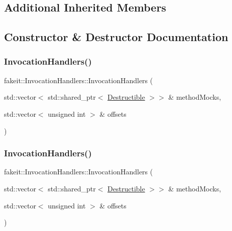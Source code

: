 \subsection*{Additional Inherited Members}


\subsection{Constructor \& Destructor Documentation}
\mbox{\label{classfakeit_1_1InvocationHandlers_a2fd61aecd4f313aa0ca83b2ab438eeef}} 
\subsubsection{\texorpdfstring{InvocationHandlers()}{InvocationHandlers()}\hspace{0.1cm}{\footnotesize\ttfamily [1/9]}}
{\footnotesize\ttfamily fakeit\+::\+Invocation\+Handlers\+::\+Invocation\+Handlers (\begin{DoxyParamCaption}\item[{std\+::vector$<$ std\+::shared\+\_\+ptr$<$ \mbox{\hyperlink{classfakeit_1_1Destructible}{Destructible}} $>$$>$ \&}]{method\+Mocks,  }\item[{std\+::vector$<$ unsigned int $>$ \&}]{offsets }\end{DoxyParamCaption})\hspace{0.3cm}{\ttfamily [inline]}}

\mbox{\label{classfakeit_1_1InvocationHandlers_a2fd61aecd4f313aa0ca83b2ab438eeef}} 
\subsubsection{\texorpdfstring{InvocationHandlers()}{InvocationHandlers()}\hspace{0.1cm}{\footnotesize\ttfamily [2/9]}}
{\footnotesize\ttfamily fakeit\+::\+Invocation\+Handlers\+::\+Invocation\+Handlers (\begin{DoxyParamCaption}\item[{std\+::vector$<$ std\+::shared\+\_\+ptr$<$ \mbox{\hyperlink{classfakeit_1_1Destructible}{Destructible}} $>$$>$ \&}]{method\+Mocks,  }\item[{std\+::vector$<$ unsigned int $>$ \&}]{offsets }\end{DoxyParamCaption})\hspace{0.3cm}{\ttfamily [inline]}}

